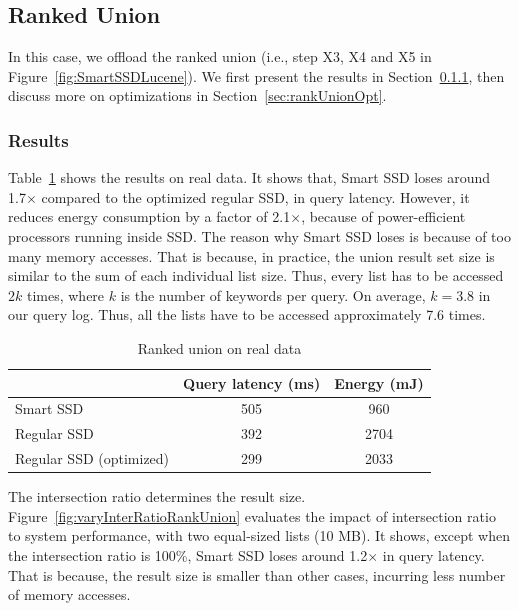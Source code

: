 \subsection{Ranked Union}\label{sec:expRankedUnion}
In this case, we offload the ranked union (i.e., step X3, X4 and X5 in Figure~\ref{fig:SmartSSDLucene}). We first present the results in Section~\ref{sec:rankUnionResults}, then discuss more on optimizations in Section~\ref{sec:rankUnionOpt}.

\subsubsection{Results}\label{sec:rankUnionResults}
Table~\ref{tab:unionRealData} shows the results on real data. It shows that, Smart SSD loses around 1.7$\times$ compared to the optimized regular SSD, in query latency. However, it reduces energy consumption by a factor of 2.1$\times$, because of power-efficient processors running inside SSD. The reason why Smart SSD loses is because of too many memory accesses. That is because, in practice, the union result set size is similar to the sum of each individual list size. Thus, every list has to be accessed $2k$ times, where $k$ is the number of keywords per query. On average, $k=3.8$ in our query log. Thus, all the lists have to be accessed approximately 7.6 times.
\begin{table}[htbp]\small
\centering
\begin{tabular}{l|c|c}\hline\hline
& \textbf{Query latency (ms)} & \textbf{Energy (mJ)}\\\hline
Smart SSD & 505 & 960 \\\hline
Regular SSD & 392 & 2704 \\\hline
Regular SSD (optimized) & 299 & 2033  \\\hline\hline
\end{tabular}
\caption{Ranked union on real data}\label{tab:unionRealData}
\end{table}


The intersection ratio determines the result size.
Figure~\ref{fig:varyInterRatioRankUnion} evaluates the impact of intersection ratio to system performance, with two equal-sized lists (10 MB).
It shows, except when the intersection ratio is 100\%, Smart SSD loses around 1.2$\times$ in query latency. That is because, the result size is smaller than other cases, incurring less number of memory accesses.

